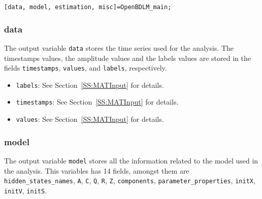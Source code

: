 { \raggedright{\colorbox{light-gray}{\lstinline[basicstyle = \mlttfamily \small]![data, model, estimation, misc]=OpenBDLM_main;!}} \\

\subsubsection{data} 

The output variable \lstinline[basicstyle = \mlttfamily \small]!data! stores the time series used for the analysis. 
The timestamps values, the amplitude values and the labels values are stored in the fields \lstinline[basicstyle = \mlttfamily \small ]!timestamps!, \lstinline[basicstyle = \mlttfamily \small ]!values!, and \lstinline[basicstyle = \mlttfamily \small ]!labels!, respectively.
\begin{itemize}
\item \lstinline[basicstyle = \mlttfamily \small ]!labels!:  See Section~\ref{SS:MATInput} for details.
\item \lstinline[basicstyle = \mlttfamily \small ]!timestamps!:  See Section~\ref{SS:MATInput} for details.
\item \lstinline[basicstyle = \mlttfamily \small ]!values!:  See Section~\ref{SS:MATInput} for details.
\end{itemize}

\subsubsection{model}
The output variable \lstinline[basicstyle = \mlttfamily \small]!model! stores all the information related to the model used in the analysis. 
This variables has 14 fields, amongst them are \lstinline[basicstyle = \mlttfamily \small ]!hidden_states_names!, \lstinline[basicstyle = \mlttfamily \small ]!A!, \lstinline[basicstyle = \mlttfamily \small ]!C!, \lstinline[basicstyle = \mlttfamily \small ]!Q!, \lstinline[basicstyle = \mlttfamily \small ]!R!, \lstinline[basicstyle = \mlttfamily \small ]!Z!, \lstinline[basicstyle = \mlttfamily \small ]!components!, \lstinline[basicstyle = \mlttfamily \small ]!parameter_properties!, \lstinline[basicstyle = \mlttfamily \small ]!initX!, \lstinline[basicstyle = \mlttfamily \small ]!initV!, \lstinline[basicstyle = \mlttfamily \small ]!initS!.


}
